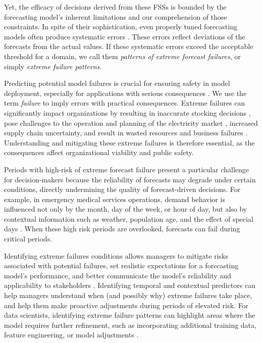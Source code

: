 \documentclass[]{interact}
\theoremstyle{definition}
\begin{document}
Yet, the efficacy of decisions derived from these FSSs is bounded by the forecasting model’s inherent limitations and our comprehension of those constraints. In spite of their sophistication, even properly tuned forecasting models often produce systematic errors \citep{eyuboglu2022}. These errors reflect deviations of the forecasts from the actual values. If these systematic errors exceed the acceptable threshold for a domain, we call them \emph{patterns of extreme forecast failures}, or simply %
\emph{extreme failure patterns}.

Predicting potential model failures is crucial for ensuring safety in model deployment, especially for applications with serious consequences \citep{tsiligkaridis2021}. We use the term \emph{failure} to imply errors with practical consequences. Extreme failures can significantly impact organizations by resulting in inaccurate stocking decisions \citep{boylan2021}, pose challenges to the operation and planning of the electricity market \citep{zhu2025}, %
increased supply chain uncertainty, and result in wasted resources and business failures \citep{chae2024}. Understanding and mitigating these extreme failures is therefore essential, as the consequences affect %
organizational viability and public safety.

Periods with high-risk of extreme forecast failure present a particular challenge for decision-makers because the reliability of forecasts may degrade under certain conditions, directly undermining the quality of forecast-driven decisions. For example, in emergency medical services operations, demand behavior is influenced not only by the month, day of the week, or hour of  day, but also by contextual information such as weather, population age, and the effect of special days \citep{abreu2023}. When these high risk periods are overlooked, forecasts can fail during critical periods.

Identifying extreme failures conditions allows managers to mitigate risks associated with potential failures, set realistic expectations for a forecasting model's performance, and better communicate the model's reliability and applicability to stakeholders \citep{cakmak2024}. Identifying temporal and contextual predictors can help managers understand when (and possibly why) extreme failures take place, and help them make proactive adjustments during periods of elevated risk. For data scientists, identifying extreme failure patterns can highlight areas where the model requires further refinement, such as incorporating additional training data, feature engineering, or model adjustments \citep{cakmak2024}. 
\end{document}
